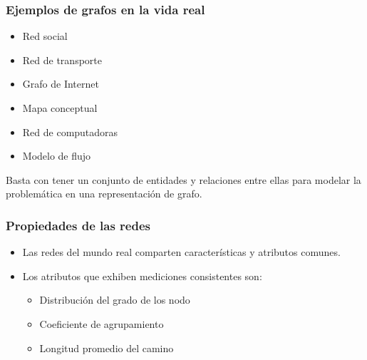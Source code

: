 \documentclass[
10pt, %
aspectratio=169, %
]{beamer}
\begin{document}
	\begin{frame}
		
		\frametitle{Ejemplos de grafos en la vida real}
		
		\begin{itemize}
			\item Red social
			\item Red de transporte
			\item Grafo de Internet
			\item Mapa conceptual
			\item Red de computadoras
			\item Modelo de flujo
		\end{itemize}
		
		\vspace{2\baselineskip}
		Basta con tener un conjunto de entidades y relaciones entre ellas para modelar la problemática en una representación de grafo. 
				
	\end{frame}
	
	\begin{frame}
		
		\frametitle{Propiedades de las redes}
		
	\begin{itemize}
		\item Las redes del mundo real comparten características y atributos comunes. \\[4mm]
		
		\item Los atributos que exhiben mediciones consistentes son:
		\begin{itemize}

			\item Distribución del grado de los nodo

			\item Coeficiente de agrupamiento

			\item Longitud promedio del camino

		\end{itemize}
		
	\end{itemize}
		
	\end{frame}
	
\end{document}
